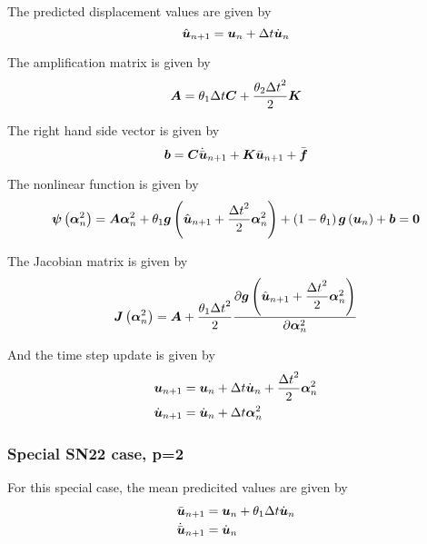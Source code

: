 The predicted displacement values are given by
\begin{equation}
   \hat{\vect{u}}_{n+1} = \vect{u}_{n}+\Delta t\dot{\vect{u}}_{n}
\end{equation}

The amplification matrix is given by
\begin{equation}
  \matr{A}=\theta_{1}\Delta t\matr{C}+\dfrac{\theta_{2}{\Delta t}^{2}}{2}\matr{K}
\end{equation}

The right hand side vector is given by
\begin{equation}
  \vect{b}=\matr{C}\dot{\bar{\vect{u}}}_{n+1}+\matr{K}\bar{\vect{u}}_{n+1}+\bar{\vect{f}}
\end{equation}

The nonlinear function is given by
\begin{equation}
  \fnof{\vect{\psi}}{\vect{\alpha}^{2}_{n}}=\matr{A}\vect{\alpha}^{2}_{n}+\theta_{1}\fnof{\vect{g}}{\hat{\vect{u}}_{n+1}+
    \dfrac{{\Delta t}^{2}}{2}\vect{\alpha}^{2}_{n}}+\pbrac{1-\theta_{1}}\fnof{\vect{g}}{\vect{u}_{n}}+\vect{b}=\vect{0}
\end{equation}

The Jacobian matrix is given by
\begin{equation}
  \fnof{\matr{J}}{\vect{\alpha}^{2}_{n}}=\matr{A}+\dfrac{\theta_{1}{\Delta t}^{2}}{2}
  \delby{\fnof{\vect{g}}{\hat{\vect{u}}_{n+1}+\dfrac{{\Delta t}^{2}}{2}\vect{\alpha}^{2}_{n}}}{\vect{\alpha}^{2}_{n}}
\end{equation}

And the time step update is given by
\begin{equation}
  \begin{split}
    \vect{u}_{n+1} &= \vect{u}_{n}+\Delta t\dot{\vect{u}}_{n} +\dfrac{{\Delta t}^{2}}{2}\vect{\alpha}^{2}_{n} \\
    \dot{\vect{u}}_{n+1} &= \dot{\vect{u}}_{n}+\Delta t\vect{\alpha}^{2}_{n}
  \end{split}
\end{equation}

\subsubsection{Special SN22 case, p=2}

For this special case, the mean predicited values are given by
\begin{equation}
  \begin{split}
    \bar{\vect{u}}_{n+1} &= \vect{u}_{n}+\theta_{1}\Delta t\dot{\vect{u}}_{n}\\
    \dot{\bar{\vect{u}}}_{n+1} &= \dot{\vect{u}}_{n}
  \end{split}
\end{equation}

